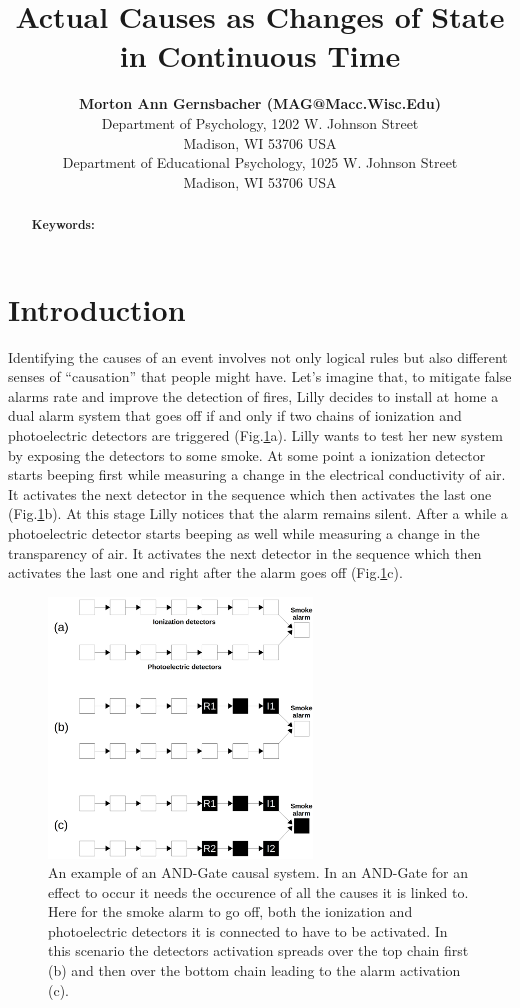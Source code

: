\documentclass[10pt,letterpaper]{article}
\title{Actual Causes as Changes of State in Continuous Time}
\author{{\large \bf Morton Ann Gernsbacher (MAG@Macc.Wisc.Edu)} \\
  Department of Psychology, 1202 W. Johnson Street \\
  Madison, WI 53706 USA
  \AND {\large \bf Sharon J.~Derry (SDJ@Macc.Wisc.Edu)} \\
  Department of Educational Psychology, 1025 W. Johnson Street \\
  Madison, WI 53706 USA}
\begin{document}
\maketitle


\begin{abstract}

\textbf{Keywords:} 
\end{abstract}


\section{Introduction}

Identifying the causes of an event involves not only logical rules but also different senses of ``causation'' that people might have. Let's imagine that, to mitigate false alarms rate and improve the detection of fires, Lilly decides to install at home a dual alarm system that goes off if and only if two chains of ionization and photoelectric detectors are triggered (Fig.\ref{fig:1}a). Lilly wants to test her new system by exposing the detectors to some smoke. At some point a ionization detector starts beeping first while measuring a change in the electrical conductivity of air. It activates the next detector in the sequence which then activates the last one (Fig.\ref{fig:1}b). At this stage Lilly notices that the alarm remains silent. After a while a photoelectric detector starts beeping as well while measuring a change in the transparency of air. It activates the next detector in the sequence which then activates the last one and right after the alarm goes off (Fig.\ref{fig:1}c). 

\begin{figure}[h]
\begin{center}
\includegraphics[width=7cm]{intro}
\end{center}
\caption{An example of an AND-Gate causal system. In an AND-Gate for an effect to occur it needs the occurence of all the causes it is linked to. Here for the smoke alarm to go off, both the ionization and photoelectric detectors it is connected to have to be activated. In this scenario the detectors activation spreads over the top chain first (b) and then over the bottom chain leading to the alarm activation (c).} 
\label{fig:1}
\end{figure}
\end{document}
